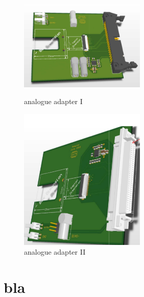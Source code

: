 \documentclass[british,11pt,a4paper]{memoir}
\begin{document}
\begin{center}
	\begin{figure}
		\begin{minipage}{6cm}
			\includegraphics[width=6cm]{adapterAna}
			\caption{analogue adapter I}
			\label{p4}
		\end{minipage}
		\hfill
		\begin{minipage}{6cm}
			\includegraphics[width=6cm]{adapterAnaII}
			\caption{analogue adapter II}
			\label{p5}
		\end{minipage}
	\end{figure}
\end{center} 


\chapter{bla}



\end{document}
